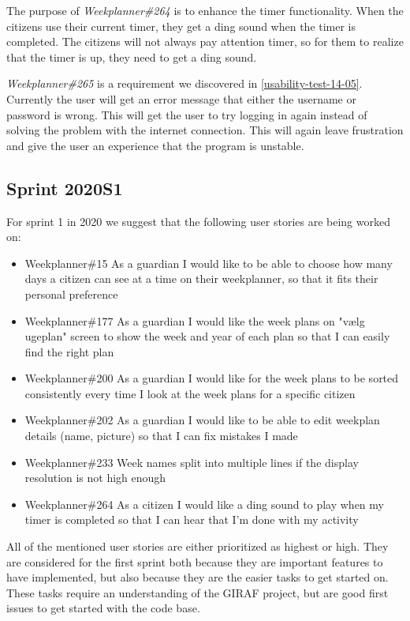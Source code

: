 The purpose of \textit{Weekplanner\#264} is to enhance the timer functionality.
When the citizens use their current timer, they get a ding sound when the timer is completed.
The citizens will not always pay attention timer, so for them to realize that the timer is up, they need to get a ding sound.

\textit{Weekplanner\#265} is a requirement we discovered in \autoref{usability-test-14-05}. 
Currently the user will get an error message that either the username or password is wrong. 
This will get the user to try logging in again instead of solving the problem with the internet connection.
This will again leave frustration and give the user an experience that the program is unstable.

\subsection{Sprint 2020S1}
For sprint 1 in 2020 we suggest that the following user stories are being worked on:

\begin{itemize}
    \item Weekplanner\#15 As a guardian I would like to be able to choose how many days a citizen can see at a time on their weekplanner, so that it fits their personal preference 
    \item Weekplanner\#177 As a guardian I would like the week plans on "vælg ugeplan" screen to show the week and year of each plan so that I can easily find the right plan 
    \item Weekplanner\#200 As a guardian I would like for the week plans to be sorted consistently every time I look at the week plans for a specific citizen
    \item Weekplanner\#202 As a guardian I would like to be able to edit weekplan details (name, picture) so that I can fix mistakes I made
    \item Weekplanner\#233 Week names split into multiple lines if the display resolution is not high enough 
    \item Weekplanner\#264 As a citizen I would like a ding sound to play when my timer is completed so that I can hear that I'm done with my activity
\end{itemize}
\noindent
All of the mentioned user stories are either prioritized as highest or high. 
They are considered for the first sprint both because they are important features to have implemented, but also because they are the easier tasks to get started on.
These tasks require an understanding of the GIRAF project, but are good first issues to get started with the code base.
